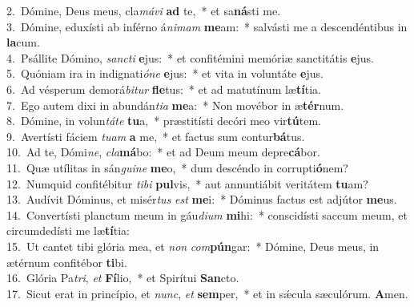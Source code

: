 {2.~}Dómine, Deus meus, cla\textit{má}\textit{vi} \textbf{ad} te,~* et sa\textbf{ná}sti me.\\
{3.~}Dómine, eduxísti ab inférno á\textit{ni}\textit{mam} \textbf{me}am:~* salvásti me a descendéntibus in \textbf{la}cum.\\
{4.~}Psállite Dómino, \textit{san}\textit{cti} \textbf{e}jus:~* et confitémini memóriæ sanctitátis \textbf{e}jus.\\
{5.~}Quóniam ira in indignati\textit{ó}\textit{ne} \textbf{e}jus:~* et vita in voluntáte \textbf{e}jus.\\
{6.~}Ad vésperum demorá\textit{bi}\textit{tur} \textbf{fle}tus:~* et ad matutínum læ\textbf{tí}tia.\\
{7.~}Ego autem dixi in abundán\textit{ti}\textit{a} \textbf{me}a:~* Non movébor in æ\textbf{tér}num.\\
{8.~}Dómine, in volun\textit{tá}\textit{te} \textbf{tu}a,~* præstitísti decóri meo vir\textbf{tú}tem.\\
{9.~}Avertísti fáciem \textit{tu}\textit{am} \textbf{a} me,~* et factus sum contur\textbf{bá}tus.\\
{10.~}Ad te, Dómi\textit{ne}, \textit{cla}\textbf{má}bo:~* et ad Deum meum depre\textbf{cá}bor.\\
{11.~}Quæ utílitas in sán\textit{gui}\textit{ne} \textbf{me}o,~* dum descéndo in corrupti\textbf{ó}nem?\\
{12.~}Numquid confitébitur \textit{ti}\textit{bi} \textbf{pul}vis,~* aut annuntiábit veritátem \textbf{tu}am?\\
{13.~}Audívit Dóminus, et misér\textit{tus} \textit{est} \textbf{me}i:~* Dóminus factus est adjútor \textbf{me}us.\\
{14.~}Convertísti planctum meum in gáu\textit{di}\textit{um} \textbf{mi}hi:~* conscidísti saccum meum, et circumdedísti me læ\textbf{tí}tia:\\
{15.~}Ut cantet tibi glória mea, et \textit{non} \textit{com}\textbf{pún}gar:~* Dómine, Deus meus, in ætérnum confitébor \textbf{ti}bi.\\
{16.~}Glória Pa\textit{tri}, \textit{et} \textbf{Fí}lio,~* et Spirítui \textbf{San}cto.\\
{17.~}Sicut erat in princípio, et \textit{nunc}, \textit{et} \textbf{sem}per,~* et in sǽcula sæculórum. \textbf{A}men.\\
